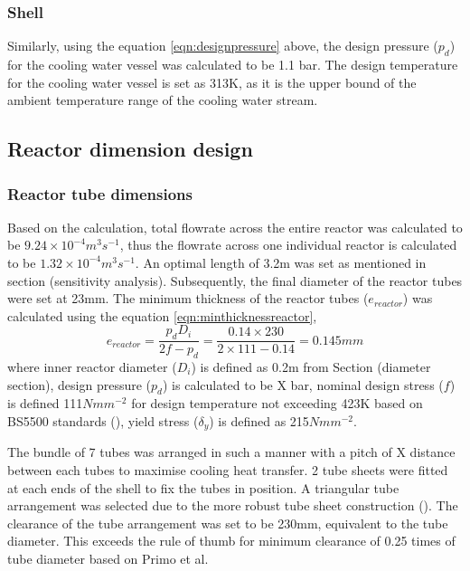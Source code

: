 \subsubsection{Shell}
Similarly, using the equation \ref{eqn:designpressure} above, the design pressure ($p_d$) for the cooling water vessel was calculated to be 1.1 bar. The design temperature for the cooling water vessel is set as 313K, as it is the upper bound of the ambient temperature range of the cooling water stream. 

\subsection{Reactor dimension design}
\label{sec:reactordimensions}

\subsubsection{Reactor tube dimensions}
Based on the calculation, total flowrate across the entire reactor was calculated to be $9.24 \times 10^{-4} m^3s^{-1}$, thus the flowrate across one individual reactor is calculated to be  $1.32 \times 10^{-4} m^3s^{-1}$. An optimal length of 3.2m was set as mentioned in section (sensitivity analysis). Subsequently, the final diameter of the reactor tubes were set at 23mm.  
The minimum thickness of the reactor tubes ($e_{reactor}$) was calculated using the equation \ref{eqn:minthicknessreactor},
\begin{equation}
    e_{reactor} = \frac{p_dD_i}{2f-p_d} = \frac{0.14 \times 230}{2 \times 111 - 0.14} = 0.145mm
    \label{eqn:minthicknessreactor}
\end{equation}
where inner reactor diameter ($D_i$) is defined as 0.2m from Section (diameter section), design pressure ($p_d$) is calculated to be X bar, nominal design stress ($f$) is defined 111$Nmm^{-2}$ for design temperature not exceeding 423K based on BS5500 standards (), yield stress ($\delta_y$) is defined as 215$Nmm^{-2}$. 


The bundle of 7 tubes was arranged in such a manner with a pitch of X distance between each tubes to maximise cooling heat transfer. 2 tube sheets were fitted at each ends of the shell to fix the tubes in position. A triangular tube arrangement was selected due to the more robust tube sheet construction (). The clearance of the tube arrangement was set to be 230mm, equivalent to the tube diameter. This exceeds the rule of thumb for minimum clearance of 0.25 times of tube diameter based on Primo et al. 



